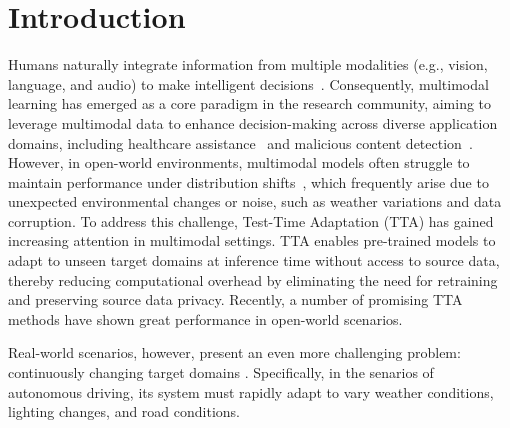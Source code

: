 \section{Introduction}
\label{sec:intro}



Humans naturally integrate information from multiple modalities (e.g., vision, language, and audio) to make intelligent decisions~\cite{baltruvsaitis2018multimodal}. Consequently, multimodal learning has emerged as a core paradigm in the research community, aiming to leverage multimodal data to enhance decision-making across diverse application domains, including healthcare assistance~\cite{ghosh2024clipsyntel} and malicious content detection~\cite{kiela2020hateful}. However, in open-world environments, multimodal models often struggle to maintain performance under distribution shifts~\cite{liang2025comprehensive}, which frequently arise due to unexpected environmental changes or noise, such as weather variations and data corruption. To address this challenge, Test-Time Adaptation (TTA) has gained increasing attention in multimodal settings. TTA enables pre-trained models to adapt to unseen target domains at inference time without access to source data, thereby reducing computational overhead by eliminating the need for retraining and preserving source data privacy. Recently, a number of promising TTA methods have shown great performance in open-world scenarios.

Real-world scenarios, however, present an even more challenging problem: continuously changing target domains \cite{wang2022continual}. Specifically, in the senarios of autonomous driving, its system must rapidly adapt to vary weather conditions, lighting changes, and road conditions.
